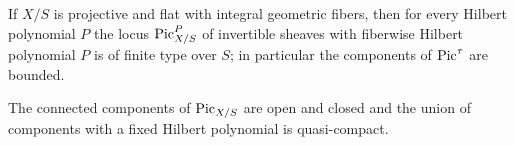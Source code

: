 \begin{theorem}\label{fga-thm-9-6-20}
If $X/S$ is projective and flat with integral geometric fibers, then for every
Hilbert polynomial $P$ the locus $\operatorname{Pic}^P_{X/S}$ of invertible sheaves with
fiberwise Hilbert polynomial $P$ is of finite type over $S$; in particular the
components of $\operatorname{Pic}^\tau$ are bounded.
\end{theorem}
\begin{corollary}\label{fga-cor-9-6-25}
The connected components of $\operatorname{Pic}_{X/S}$ are open and closed and the union of
components with a fixed Hilbert polynomial is quasi-compact.
\end{corollary}
